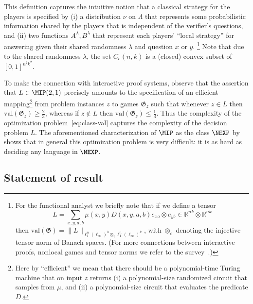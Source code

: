 \documentclass[11pt]{article}
\theoremstyle{definition}
\newcommand{\R}{\ensuremath{\mathbb{R}}}
\newcommand{\val}{\ensuremath{\mathrm{val}}}
\newcommand{\game}{\mathfrak{G}}
\begin{document}
This definition captures the intuitive notion that a classical strategy for the players is specified by (i) a distribution $\nu$ on $\Lambda$ that represents some probabilistic information shared by the players that is independent of the verifier's questions, and (ii) two functions $A^\lambda,B^\lambda$ that represent each players' ``local strategy'' for answering given their shared randomness $\lambda$ and question $x$ or $y$. \footnote{For the functional analyst we briefly note that if we define a tensor 
\[L  = \sum_{x,y,a,b} \mu(x,y)D(x,y,a,b) e_{xa}\otimes e_{yb} \in \R^{nk}\otimes \R^{nk}\]
then $\val(\game) = \|L\|_{\ell_1^n(\ell_\infty)^k \otimes_\epsilon \ell_1^n(\ell_\infty)^k}$, with $\otimes_\epsilon$ denoting the injective tensor norm of Banach spaces. (For more connections between interactive proofs, nonlocal games and tensor norms we refer to the survey~\cite{palazuelos2016survey}.)} Note that due to the shared randomness $\lambda$, the set $C_c(n,k)$ is a (closed) convex subset of $[0,1]^{n^2k^2}$. 

To make the connection with interactive proof systems, observe that the assertion that $L\in \MIP(2,1)$ precisely amounts to the specification of an efficient mapping\footnote{Here by ``efficient'' we mean that there should be a polynomial-time Turing machine that on input $z$ returns (i) a polynomial-size randomized circuit that samples from $\mu$, and (ii) a polynomial-size circuit that evaluates the predicate $D$.} from problem instances $z$ to games $\game_z$ such that whenever $z\in L$ then  $\val(\game_z) \geq \frac{2}{3}$, whereas if $z \notin L$ then $\val(\game_z) \leq \frac{1}{3}$. Thus the complexity of the optimization problem~\eqref{eq:class-val} captures the complexity of the decision problem $L$. The aforementioned characterization of $\MIP$ as the class $\NEXP$ by~\cite{babai1991non} shows that in general this optimization problem is very difficult: it is as hard as deciding any language in $\NEXP$. 



\subsection{Statement of result}
\label{sec:result}
\end{document}
